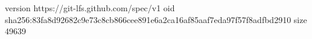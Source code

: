version https://git-lfs.github.com/spec/v1
oid sha256:83fa8d92682c9e73c8cb866cee891e6a2ca16af85aaf7eda97f57f8adfbd2910
size 49639
